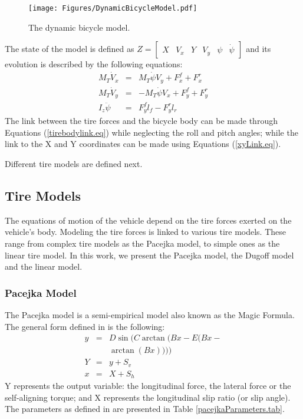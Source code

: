 \documentclass[journal]{IEEEtran}
\begin{document}
\begin{figure}[h]
    \centering
    \texttt{[image: Figures/DynamicBicycleModel.pdf]}
    \caption{The dynamic bicycle model.}
    \label{bicycleModel.fig}
\end{figure}

The state of the model is defined as $Z=\begin{bmatrix} X & V_x & Y & V_y & \psi & \dot\psi \end{bmatrix}$ and its evolution is described by the following equations: 
 \begin{subequations}\label{DBM.eq}
     \begin{eqnarray}
         M_T \dot V_x &=& M_T\dot\psi V_y + F_{x}^{f} + F_{x}^{r} \\
         M_T \dot V_y &=& -M_T\dot\psi V_x + F_{y}^{f} + F_{y}^{r} \\
         I_z \ddot\psi &=& F_{y}^{f}l_f - F_{y}^{r}l_r
     \end{eqnarray}
 \end{subequations}
The link between the tire forces and the bicycle body can be made through Equations (\ref{tirebodylink.eq}) while neglecting the roll and pitch angles; while the link to the X and Y coordinates can be made using Equations (\ref{xyLink.eq}). 

Different tire models are defined next.

\subsection{Tire Models}
The equations of motion of the vehicle depend on the tire forces exerted on the vehicle's body. Modeling the tire forces is linked to various tire models. These range from complex tire models as the Pacejka \cite{pacejka_magic_1997} model, to simple ones as the linear tire model. In this work, we present the Pacejka model, the Dugoff model and the linear model. 

\subsubsection{Pacejka Model}
The Pacejka model is a semi-empirical model also known as the Magic Formula. The general form defined in \cite{pacejka_tyre_2006} is the following: 
\begin{subequations}
\begin{eqnarray}
y &=& D\sin(C\arctan(Bx-E(Bx-  \\
&&\arctan(Bx)))) \nonumber\\
Y &=& y+S_v\\
x &=& X+S_h
\end{eqnarray}
\end{subequations}
Y represents the output variable: the longitudinal force, the lateral force or the self-aligning torque; and X represents the longitudinal slip ratio (or slip angle). The parameters as defined in \cite{pacejka_tyre_2006} are presented in Table \ref{pacejkaParameters.tab}.
\end{document}
